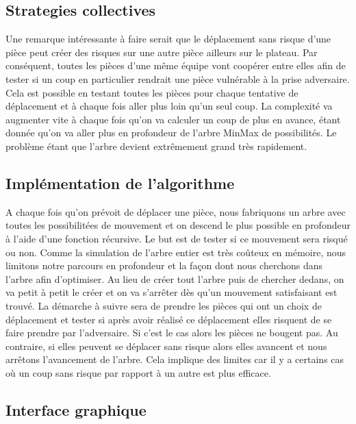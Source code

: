 \documentclass[11pt]{article} %
\begin{document}
\subsection{Strategies collectives}

Une remarque intéressante à faire serait que le déplacement sans risque d’une pièce peut créer des risques sur une autre pièce ailleurs sur le plateau. Par conséquent, toutes les pièces d'une même équipe vont coopérer entre elles afin de tester si un coup en particulier rendrait une pièce vulnérable à la prise adversaire. Cela est possible en testant toutes les pièces pour chaque tentative de déplacement et à chaque fois aller plus loin qu'un seul coup.  
La complexité va augmenter vite à chaque fois qu’on va calculer un coup de plus en avance, étant donnée qu’on va aller plus en profondeur de l’arbre MinMax de possibilités.
Le problème étant que l'arbre devient extrêmement grand très rapidement.


\subsection{Implémentation de l’algorithme}

A chaque fois qu'on prévoit de déplacer une pièce, nous fabriquons un arbre avec toutes les possibilitées de mouvement et on descend le plus possible en profondeur à l’aide d’une fonction récursive. Le but est de tester si ce mouvement sera risqué ou non. 
Comme la simulation de l’arbre entier est très coûteux en mémoire, nous limitons notre parcours en profondeur et la façon dont nous cherchons dans l'arbre afin d’optimiser. Au lieu de créer tout l'arbre puis de chercher dedans, on va petit à petit le créer et on va s’arrêter dès qu'un mouvement satisfaisant est trouvé. 
La démarche à suivre sera de prendre les pièces qui ont un choix de déplacement et tester si après avoir réalisé ce déplacement elles risquent de se faire prendre par l'adversaire.
Si c'est le cas alors les pièces ne bougent pas. Au contraire, si elles peuvent se déplacer sans risque alors elles avancent et nous arrêtons l’avancement de l’arbre. 
Cela implique des limites car il y a certains cas où un coup sans risque par rapport à un autre est plus efficace.

\subsection{Interface graphique}
\end{document}
